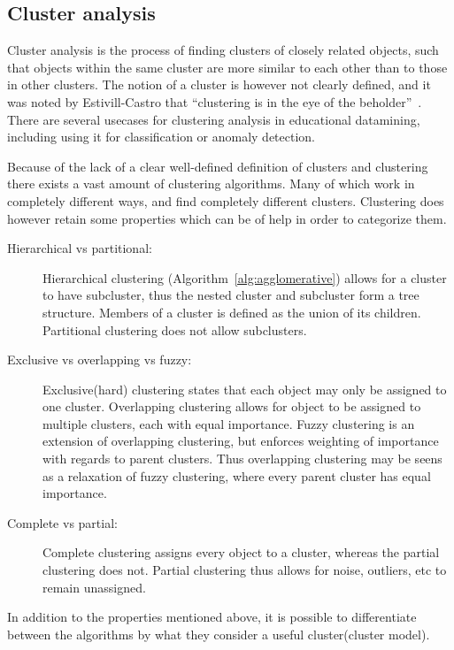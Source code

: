 \subsection{Cluster analysis}
Cluster analysis is the process of finding clusters of closely related objects, such that objects within the same cluster are more similar to each other than to those in other clusters. 
The notion of a cluster is however not clearly defined, and it was noted by Estivill-Castro that "`clustering is in the eye of the beholder"'~\cite{estivill2002so}.
There are several usecases for clustering analysis in educational datamining, including using it for classification or anomaly detection.

\bigskip\noindent
Because of the lack of a clear well-defined definition of clusters and clustering there exists a vast amount of clustering algorithms. 
Many of which work in completely different ways, and find completely different clusters. 
Clustering does however retain some properties which can be of help in order to categorize them. 

\begin{description}
	\item[Hierarchical vs partitional:] Hierarchical clustering (Algorithm~\ref{alg:agglomerative}) allows for a cluster to have subcluster, thus the nested cluster and subcluster form a tree structure. Members of a cluster is defined as the union of its children. Partitional clustering does not allow subclusters. 
	\item[Exclusive vs overlapping vs fuzzy:] Exclusive(hard) clustering states that each object may only be assigned to one cluster. Overlapping clustering allows for object to be assigned to multiple clusters, each with equal importance. Fuzzy clustering is an extension of overlapping clustering, but enforces weighting of importance with regards to parent clusters. Thus overlapping clustering may be seens as a relaxation of fuzzy clustering, where every parent cluster has equal importance.
	\item[Complete vs partial:] Complete clustering assigns every object to a cluster, whereas the partial clustering does not. Partial clustering thus allows for noise, outliers, etc to remain unassigned.
\end{description}

\bigskip\noindent
In addition to the properties mentioned above, it is possible to 
differentiate between the algorithms by what they consider a useful cluster(cluster model). 

